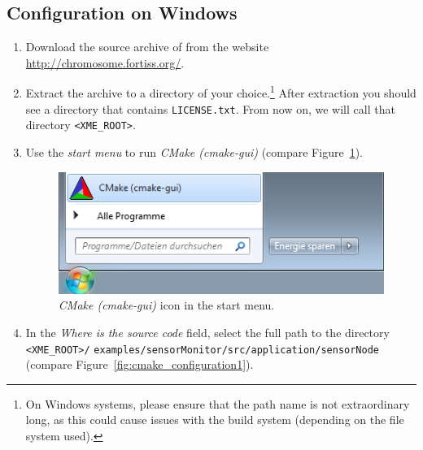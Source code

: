 \subsection{Configuration on Windows}
\label{sec:example_sensorMonitor:windows}

\begin{enumerate}
	\item Download the source archive of \xme from the website \\
		\url{http://chromosome.fortiss.org/}.
	
	\item Extract the archive to a directory of your choice.\footnote{%
		On Windows systems, please ensure that the path name is not extraordinary long, as this could cause issues with the build system (depending on the file system used).}
		After extraction you should see a directory that contains \verb|LICENSE.txt|.
		From now on, we will call that directory \verb|<XME_ROOT>|.

	\item Use the \emph{start menu} to run \emph{CMake (cmake-gui)} (compare Figure~\ref{fig:cmake_run}).
\begin{figure}[htpb]
	\centering
	\includegraphics[scale=0.75]{figures/cmake_run.png}
	\caption{\emph{CMake (cmake-gui)} icon in the start menu.}
	\label{fig:cmake_run}
\end{figure}
	\item In the \emph{Where is the source code} field, select the full path to the directory
		\verb|<XME_ROOT>/| \verb|examples/sensorMonitor/src/application/sensorNode| (compare Figure~\ref{fig:cmake_configuration1}).



\end{enumerate}
